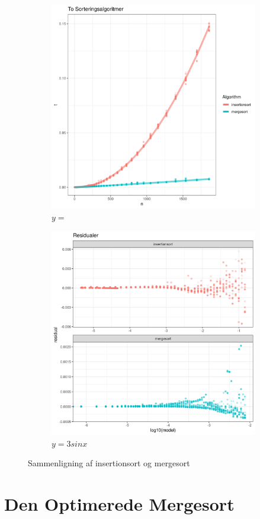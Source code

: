 \begin{figure}
	\centering
	\begin{subfigure}[b]{0.45\textwidth}
		\centering
		\includegraphics[width=\textwidth]{../img/toAlgoritmer.png}
		\caption{$y=$}
		\label{fig:regressioner}
	\end{subfigure}
	\hfill
	\begin{subfigure}[b]{0.45\textwidth}
		\centering
		\includegraphics[width=\textwidth]{../img/toAlgoritmerResidual}
		\caption{$y=3sinx$}
		\label{fig:residualplot}
	\end{subfigure}
	\caption{Sammenligning af insertionsort og mergesort}
	\label{toAlgoritmer}
\end{figure}

\section{Den Optimerede Mergesort}
\label{sec:Den Optimerede Mergesort}





